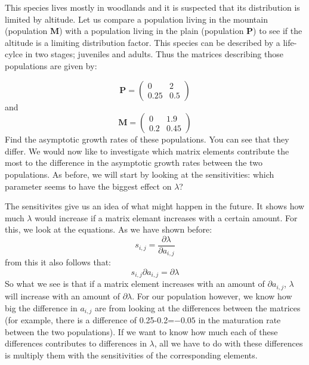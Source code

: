 \documentclass{article}\usepackage[]{graphicx}\usepackage[]{color}
\begin{document}
This species lives mostly in woodlands and it is suspected that its distribution is limited by altitude. Let us compare a population living in the mountain (population $\boldsymbol{M}$) with a population living in the plain (population $\boldsymbol{P}$) to see if the altitude is a limiting distribution factor. This species can be described by a life-cylce in two stages; juveniles and adults. Thus the matrices describing those populations are given by:

\begin{equation}
\boldsymbol{P}=\begin{pmatrix}
0&2\\
0.25&0.5
\end{pmatrix}
\end{equation}
and
\begin{equation}
\boldsymbol{M}=\begin{pmatrix}
0&1.9\\
0.2&0.45
\end{pmatrix}
\end{equation}
Find the asymptotic growth rates of these populations. You can see that they differ. We would now like to investigate which matrix elements contribute the most to the difference in the asymptotic growth rates between the two populations. As before, we will start by looking at the sensitivities: which parameter seems to have the biggest effect on $\lambda$?

The sensitivites give us an idea of what might happen in the future. It shows how much $\lambda$ would increase if a matrix elemant increases with a certain amount. For this, we look at the equations. As we have shown before:
\begin{equation}
s_{i,j} = \frac{\partial \lambda}{\partial a_{i,j}}
\end{equation}
from this it also follows that:
\begin{equation}
s_{i,j} \partial a_{i,j} = \partial \lambda
\end{equation}
So what we see is that if a matrix element increases with an amount of $\partial a_{i,j}$, $\lambda$ will increase with an amount of $\partial \lambda$. For our population however, we know how big the difference in $a_{i,j}$ are from looking at the differences between the matrices (for example, there is a difference of 0.25-0.2=\ensuremath{-0.05} in the maturation rate between the two populations). If we want to know how much each of these differences contributes to differences in $\lambda$, all we have to do with these differences is multiply them with the sensitivities of the corresponding elements.
\end{document}
